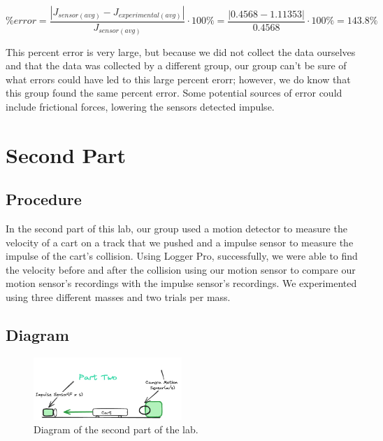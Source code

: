 \documentclass{report}
\begin{document}
$$ \% error = \frac{|J_{sensor(avg)} - J_{experimental(avg)}|}{J_{sensor(avg)}} \cdot 100\% = \frac{|0.4568 - 1.11353|}{0.4568} \cdot 100\% = 143.8\%$$

This percent error is very large, but because we did not collect the data ourselves and that the data was collected by a different group, our group can't be sure of what errors could have led to this large percent erorr; however, we do know that this group found the same percent error. Some potential sources of error could include frictional forces, lowering the sensors detected impulse. 

\section*{Second Part}

\subsection*{Procedure}

In the second part of this lab, our group used a motion detector to measure the velocity of a cart on a track that we pushed and a impulse sensor to measure the impulse of the cart's collision. Using Logger Pro, successfully, we were able to find the velocity before and after the collision using our motion sensor to compare our motion sensor's recordings with the impulse sensor's recordings. We experimented using three different masses and two trials per mass. 

\subsection*{Diagram}

\begin{figure}[h!]
  \begin{center}
    \includegraphics[width=0.5\textwidth]{figures/partTwo.png}
  \end{center}
  \caption{Diagram of the second part of the lab.}
\end{figure} 
\end{document}
